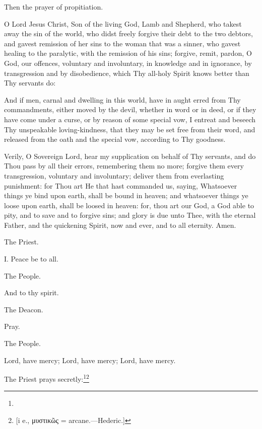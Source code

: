 Then the prayer of propitiation.

O Lord Jesus Christ, Son of the living God, Lamb and Shepherd, who takest away the sin of the world, who didst freely forgive their debt to the two debtors, and gavest remission of her sins to the woman that was a sinner, who gavest healing to the paralytic, with the remission of his sins; forgive, remit, pardon, O God, our offences, voluntary and involuntary, in knowledge and in ignorance, by transgression and by disobedience, which Thy all-holy Spirit knows better than Thy servants do:

And if men, carnal and dwelling in this world, have in aught erred from Thy commandments, either moved by the devil, whether in word or in deed, or if they have come under a curse, or by reason of some special vow, I entreat and beseech Thy unspeakable loving-kindness, that they may be set free from their word, and released from the oath and the special vow, according to Thy goodness.

Verily, O Sovereign Lord, hear my supplication on behalf of Thy servants, and do Thou pass by all their errors, remembering them no more; forgive them every transgression, voluntary and involuntary; deliver them from everlasting punishment: for Thou art He that hast commanded us, saying, Whatsoever things ye bind upon earth, shall be bound in heaven; and whatsoever things ye loose upon earth, shall be loosed in heaven: for, thou art our God, a God able to pity, and to save and to forgive sins; and glory is due unto Thee, with the eternal Father, and the quickening Spirit, now and ever, and to all eternity. Amen.


The Priest.

I. Peace be to all.

The People.

And to thy spirit.

The Deacon.

Pray.

The People.

Lord, have mercy; Lord, have mercy; Lord, have mercy.

The Priest prays secretly:\footnote{}\footnote{\par{}  [i e., \textgreek{μυστικῶς} = arcane.—Hederic.]}

